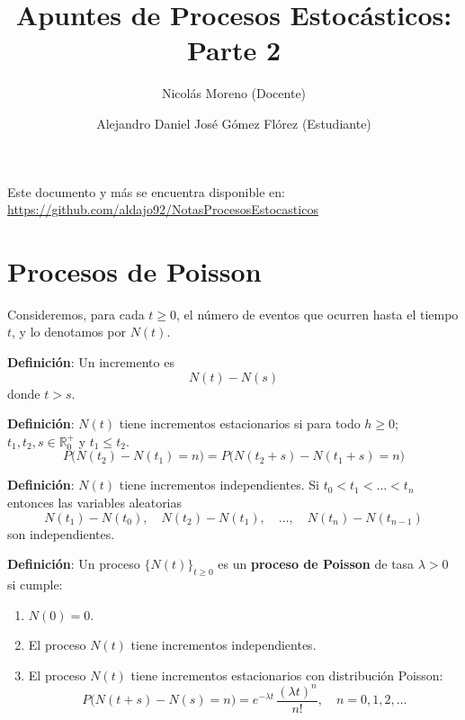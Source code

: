 \documentclass[12pt,a4paper]{article}
\title{Apuntes de Procesos Estocásticos: Parte 2}
\author{Nicolás Moreno (Docente)}
\author{Alejandro Daniel José Gómez Flórez (Estudiante)}
\date{}
\newcommand{\definicion}[1]{%
\begin{definicionbox}
\textbf{Definición}: #1
\end{definicionbox}
}
\begin{document}
\maketitle

Este documento y más se encuentra disponible en: \\
\url{https://github.com/aldajo92/NotasProcesosEstocasticos}

\section{Procesos de Poisson}

Consideremos, para cada $t \geq 0$, el número de eventos que ocurren hasta el tiempo $t$, y lo denotamos por $N(t)$.

\definicion{Un incremento es 
\begin{equation*}
N(t) - N(s)
\end{equation*}
donde $t > s$.}

\definicion{$N(t)$ tiene incrementos estacionarios si para todo $h \geq 0$; $t_1, t_2, s \in \mathbb{R}_{0}^+$ y $t_1 \leq t_{2}$.
\begin{equation*}
P\big(N(t_{2}) - N(t_{1}) = n\big) 
= P\big(N(t_{2}+s) - N(t_{1}+s) = n\big)
\end{equation*}}

\begin{center}
\end{center}

\definicion{$N(t)$ tiene incrementos independientes. Si $t_{0} < t_{1} < \dots < t_{n}$ entonces las variables aleatorias
\begin{equation*}
N(t_{1}) - N(t_{0}), \quad 
N(t_{2}) - N(t_{1}), \quad \dots, \quad 
N(t_{n}) - N(t_{n-1})
\end{equation*}
son independientes.}

\definicion{Un proceso $\{N(t)\}_{t \geq 0}$ es un \textbf{proceso de Poisson} de tasa $\lambda > 0$ si cumple:
\begin{enumerate}
    \item $N(0) = 0$.
    \item El proceso $N(t)$ tiene incrementos independientes.
    \item El proceso $N(t)$ tiene incrementos estacionarios con distribución Poisson:
    \begin{equation*}
    P\big(N(t+s) - N(s) = n\big) 
    = e^{-\lambda t} \, \frac{(\lambda t)^n}{n!}, 
    \quad n = 0,1,2,\dots
    \end{equation*}
\end{enumerate}}
\end{document}

